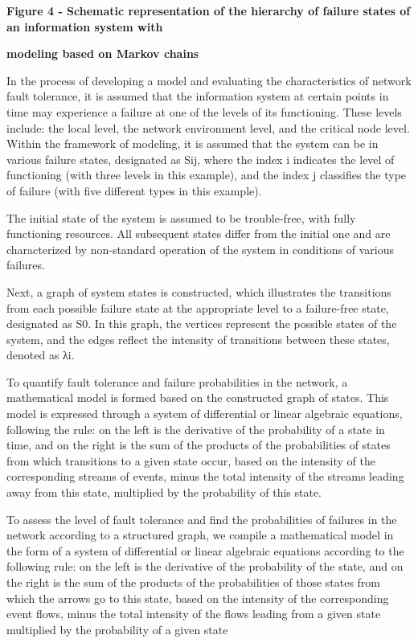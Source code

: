 \textbf{Figure 4 - Schematic representation of the hierarchy of failure
states of an information system with}

\textbf{modeling based on Markov chains}

In the process of developing a model and evaluating the characteristics
of network fault tolerance, it is assumed that the information system at
certain points in time may experience a failure at one of the levels of
its functioning. These levels include: the local level, the network
environment level, and the critical node level. Within the framework of
modeling, it is assumed that the system can be in various failure
states, designated as Sij, where the index i indicates the level of
functioning (with three levels in this example), and the index j
classifies the type of failure (with five different types in this
example).

The initial state of the system is assumed to be trouble-free, with
fully functioning resources. All subsequent states differ from the
initial one and are characterized by non-standard operation of the
system in conditions of various failures.

Next, a graph of system states is constructed, which illustrates the
transitions from each possible failure state at the appropriate level to
a failure-free state, designated as S0. In this graph, the vertices
represent the possible states of the system, and the edges reflect the
intensity of transitions between these states, denoted as λi.

To quantify fault tolerance and failure probabilities in the network, a
mathematical model is formed based on the constructed graph of states.
This model is expressed through a system of differential or linear
algebraic equations, following the rule: on the left is the derivative
of the probability of a state in time, and on the right is the sum of
the products of the probabilities of states from which transitions to a
given state occur, based on the intensity of the corresponding streams
of events, minus the total intensity of the streams leading away from
this state, multiplied by the probability of this state.

To assess the level of fault tolerance and find the probabilities of
failures in the network according to a structured graph, we compile a
mathematical model in the form of a system of differential or linear
algebraic equations according to the following rule: on the left is the
derivative of the probability of the state, and on the right is the sum
of the products of the probabilities of those states from which the
arrows go to this state, based on the intensity of the corresponding
event flows, minus the total intensity of the flows leading from a given
state multiplied by the probability of a given state

